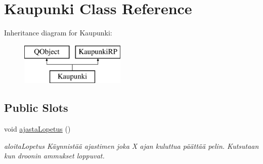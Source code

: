 \hypertarget{class_kaupunki}{\section{Kaupunki Class Reference}
\label{class_kaupunki}
}
Inheritance diagram for Kaupunki\-:\begin{figure}[H]
\begin{center}
\leavevmode
\includegraphics[height=2.000000cm]{class_kaupunki}
\end{center}
\end{figure}
\subsection*{Public Slots}
\begin{DoxyCompactItemize}
\item 
void \hyperlink{class_kaupunki_abbd4ebfe6854442610e5140023583c4d}{ajasta\-Lopetus} ()
\begin{DoxyCompactList}\small\item\em aloita\-Lopetus Käynnistää ajastimen joka X ajan kuluttua päättää pelin. Kutsutaan kun droonin ammukset loppuvat. \end{DoxyCompactList}\end{DoxyCompactItemize}
